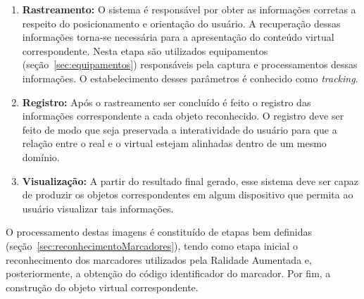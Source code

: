 	\begin{enumerate}
	  \item \textbf{Rastreamento:} O sistema é responsável por obter as informações corretas a respeito
	  do posicionamento e orientação do usuário. A recuperação dessas informações torna-se necessária
	  		para a apresentação do conteúdo virtual correspondente. Nesta etapa são utilizados equipamentos
	  		(seção~\ref{sec:equipamentos}) responsáveis pela captura e processamentos dessas informações. O
	  		estabelecimento desses parâmetros é conhecido como \textit{tracking}. 
	  
	  \item \textbf{Registro:} Após o rastreamento ser concluído é feito o registro das informações
	  		correspondente a cada objeto reconhecido. O registro deve ser feito de modo que seja
	  		preservada a interatividade do usuário para que a relação entre o real e o virtual estejam
	  		alinhadas dentro de um mesmo domínio.
	  			
	  \item \textbf{Visualização:} A partir do resultado final gerado, esse sistema deve ser capaz de
	  produzir os objetos correspondentes em algum dispositivo que permita ao usuário visualizar tais
	  		informações.
	  
	\end{enumerate}
	
	O processamento destas imagens é constituído de etapas bem definidas
	(seção~\ref{sec:reconhecimentoMarcadores}), tendo como etapa inicial o reconhecimento dos
	marcadores utilizados pela Ralidade Aumentada e, posteriormente, a obtenção do código
	identificador do marcador. Por fim, a construção do objeto virtual correspondente.
	
	
	
	
	
		
		
